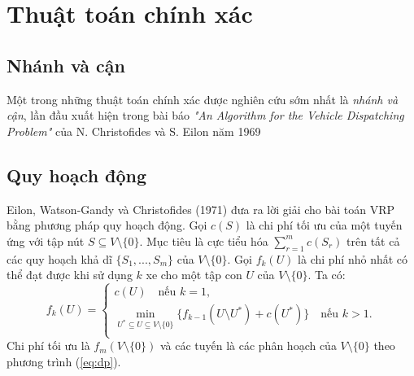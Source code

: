 \section{Thuật toán chính xác}

\subsection{Nhánh và cận}
Một trong những thuật toán chính xác được nghiên cứu sớm nhất là \textit{nhánh và cận}, lần đầu xuất hiện trong bài báo \textit{"An Algorithm for the Vehicle Dispatching Problem"} của N. Christofides và S. Eilon năm 1969 \cite{christofides1969algorithm}

\subsection{Quy hoạch động}
Eilon, Watson-Gandy và Christofides (1971) \cite{christofides1969algorithm} đưa ra lời giải cho bài toán VRP bằng phương pháp quy hoạch động. Gọi $c(S)$ là chi phí tối ưu của một tuyến ứng với tập nút $S \subseteq V \setminus \{0\}$. Mục tiêu là cực tiểu hóa $\sum_{r=1}^{m} c(S_r)$ trên tất cả các quy hoạch khả dĩ $\{S_1,...,S_m\}$ của $V \setminus \{0\}$. Gọi $f_k(U)$ là chi phí nhỏ nhất có thể đạt được khi sử dụng $k$ xe cho một tập con $U$ của $V \setminus \{0\}$. Ta có:
\begin{equation}
	\label{eq:dp}
	f_k(U) =
	\begin{cases}
		c(U) \quad \text{nếu } k = 1,                                                                                      \\
		\min_{U^* \subseteq U \subseteq V \setminus \{0\}} \{f_{k-1} (U \setminus U^*) + c(U^*)\} \quad \text{nếu } k > 1. \\
	\end{cases}
\end{equation}
Chi phí tối ưu là $f_m(V \setminus \{0\})$ và các tuyến là các phân hoạch của $V \setminus \{0\}$ theo phương trình (\ref{eq:dp}).

